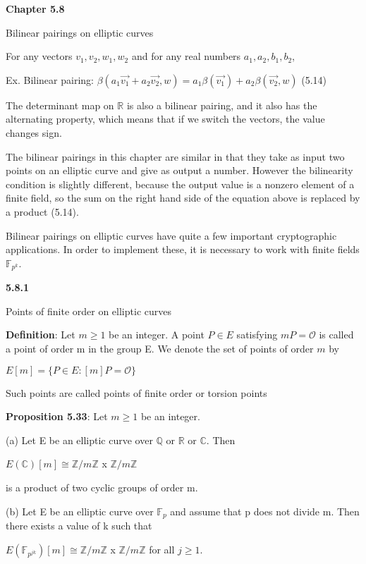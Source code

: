 \documentclass[titlepage]{article}
\begin{document}
\textbf{Chapter 5.8}

Bilinear pairings on elliptic curves

\vspace{5mm}
For any vectors $v_1, v_2, w_1, w_2$ and for any real numbers $a_1, a_2, b_1, b_2$, 

Ex. Bilinear pairing: $\beta(a_1 \vec{v_1} + a_2\vec{v_2}, w) = a_1 \beta(\vec{v_1}) + a_2 \beta(\vec{v_2},w)$ (5.14)

The determinant map on $\mathbb{R}$ is also a bilinear pairing, and it also has the alternating property, which means that if we switch the vectors, the value changes sign. 

The bilinear pairings in this chapter are similar in that they take as input two points on an elliptic curve and give as output a number. However the bilinearity condition is slightly different, because the output value is a nonzero element of a finite field, so the sum on the right hand side of the equation above is replaced by a product (5.14). 

\vspace{5mm}
Bilinear pairings on elliptic curves have quite a few important cryptographic applications. In order to implement these, it is necessary to work with finite fields $\mathbb{F}_{p^k}$. 

\vspace{5mm}

\textbf{5.8.1}

Points of finite order on elliptic curves

\vspace{5mm}

\textbf{Definition}: Let $m \geq 1$ be an integer. A point $P \in E$ satisfying $mP=\mathcal{O}$ is called a point of order m in the group E. We denote the set of points of order $m$ by

\begin{center} 

$E[m] = \{P \in E : [m]P = \mathcal{O}\}$


\end{center} 
Such points are called points of finite order or torsion points

\textbf{Proposition 5.33}: Let $m \geq 1$ be an integer. 
\begin{center} 
(a) Let E be an elliptic curve over $\mathbb{Q}$ or $\mathbb{R}$ or $\mathbb{C}$. Then 

$E(\mathbb{C})[m] \cong \mathbb{Z}/m\mathbb{Z}$ x $\mathbb{Z}/m\mathbb{Z}$

is a product of two cyclic groups of order m.

(b) Let E be an elliptic curve over $\mathbb{F}_p$ and assume that p does not divide m. Then there exists a value of k such that 

$E(\mathbb{F}_{p^{jk}})[m] \cong \mathbb{Z}/m\mathbb{Z}$ x $\mathbb{Z}/m\mathbb{Z}$ for all $j \geq 1$.
\end{center}
\end{document}
